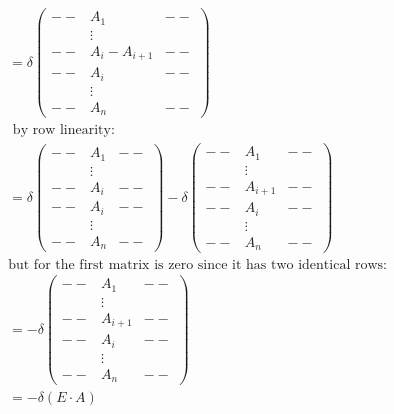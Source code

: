 {\begin{enumerate}[label=(Type: \roman*):, wide]
{\begin{align*}
					                & = \delta \begin{pmatrix} -- & A_1 & -- \\ & \vdots &  \\ -- & A_{i} - A_{i+1} & -- \\ -- & A_{i} & -- \\  & \vdots &  \\ -- & A_n & -- \end{pmatrix}                                                                                                                                    \\
					                & \text{ by row linearity:}                                                                                                                                                                                                                                                               \\
					                & = \delta \begin{pmatrix} -- & A_1 & -- \\ & \vdots &  \\ -- & A_{i} & -- \\ -- & A_{i} & -- \\  & \vdots &  \\ -- & A_n & -- \end{pmatrix} - \delta \begin{pmatrix} -- & A_1 & -- \\ & \vdots &  \\ -- & A_{i+1} & -- \\ -- & A_{i} & -- \\  & \vdots &  \\ -- & A_n & -- \end{pmatrix} \\
					                & \text{but for the first matrix is zero since it has two identical rows:}                                                                                                                                                                                                                \\
					                & = -\delta \begin{pmatrix} -- & A_1 & -- \\ & \vdots &  \\ -- & A_{i+1} & -- \\ -- & A_{i} & -- \\  & \vdots &  \\ -- & A_n & -- \end{pmatrix}                                                                                                                                           \\
					                & = - \delta(E \cdot A)
				      \end{align*}

}
\end{enumerate}}
